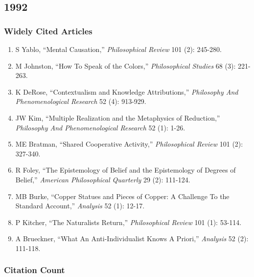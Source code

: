 \documentclass[
  10pt,
  letterpaper,
  DIV=11,
  numbers=noendperiod,
  twoside]{scrartcl}
\providecommand{\tightlist}{%
  \setlength{\itemsep}{0pt}\setlength{\parskip}{0pt}}\usepackage{longtable,booktabs,array}
\begin{document}
\newpage

\subsection{1992}\label{sec-s1992}

\subsubsection*{Widely Cited Articles}\label{widely-cited-articles-16}

\begin{enumerate}
\def\labelenumi{\arabic{enumi}.}
\tightlist
\item
  S Yablo, ``Mental Causation,'' \emph{Philosophical Review} 101 (2):
  245-280.
\item
  M Johnston, ``How To Speak of the Colors,'' \emph{Philosophical
  Studies} 68 (3): 221-263.
\item
  K DeRose, ``Contextualism and Knowledge Attributions,''
  \emph{Philosophy And Phenomenological Research} 52 (4): 913-929.
\item
  JW Kim, ``Multiple Realization and the Metaphysics of Reduction,''
  \emph{Philosophy And Phenomenological Research} 52 (1): 1-26.
\item
  ME Bratman, ``Shared Cooperative Activity,'' \emph{Philosophical
  Review} 101 (2): 327-340.
\item
  R Foley, ``The Epistemology of Belief and the Epistemology of Degrees
  of Belief,'' \emph{American Philosophical Quarterly} 29 (2): 111-124.
\item
  MB Burke, ``Copper Statues and Pieces of Copper: A Challenge To the
  Standard Account,'' \emph{Analysis} 52 (1): 12-17.
\item
  P Kitcher, ``The Naturalists Return,'' \emph{Philosophical Review} 101
  (1): 53-114.
\item
  A Brueckner, ``What An Anti-Individualist Knows A Priori,''
  \emph{Analysis} 52 (2): 111-118.
\end{enumerate}

\subsubsection*{Citation Count}\label{sec-count-1992}
\end{document}
